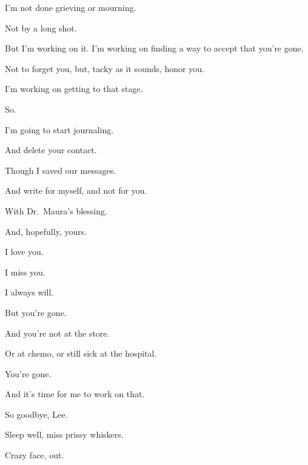 { I'm not done grieving or mourning.

 Not by a long shot.

 But I'm working on it. I'm working on finding a way to accept that you're gone.

 Not to forget you, but, tacky as it sounds, honor you.

 I'm working on getting to that stage.

 So.

 I'm going to start journaling.

 And delete your contact.

 Though I saved our messages.

 And write for myself, and not for you.

 With Dr.~Maura's blessing.

 And, hopefully, yours.

 I love you.

 I miss you.

 I always will.

 But you're gone.

 And you're not at the store.

 Or at chemo, or still sick at the hospital.

 You're gone.

 And it's time for me to work on that.

 So goodbye, Lee.

 Sleep well, miss prissy whiskers.

 Crazy face, out.

} %
